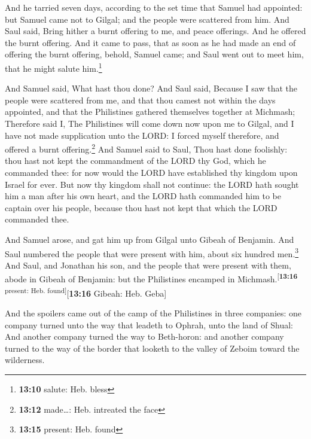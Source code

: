 And he tarried seven days, according to the set time that
Samuel had appointed: but Samuel came not to Gilgal; and the people were
scattered from him.  And Saul said, Bring hither a burnt
offering to me, and peace offerings. And he offered the burnt offering.
 And it came to pass, that as soon as he had made an end
of offering the burnt offering, behold, Samuel came; and Saul went out
to meet him, that he might salute him.\footnote{\textbf{13:10} salute:
  Heb. bless}

 And Samuel said, What hast thou done? And Saul said,
Because I saw that the people were scattered from me, and that thou
camest not within the days appointed, and that the Philistines gathered
themselves together at Michmash;  Therefore said I, The
Philistines will come down now upon me to Gilgal, and I have not made
supplication unto the LORD: I forced myself therefore, and offered a
burnt offering.\footnote{\textbf{13:12} made\ldots: Heb. intreated the
  face}  And Samuel said to Saul, Thou hast done
foolishly: thou hast not kept the commandment of the LORD thy God, which
he commanded thee: for now would the LORD have established thy kingdom
upon Israel for ever.  But now thy kingdom shall not
continue: the LORD hath sought him a man after his own heart, and the
LORD hath commanded him to be captain over his people, because thou hast
not kept that which the LORD commanded thee.

 And Samuel arose, and gat him up from Gilgal unto Gibeah
of Benjamin. And Saul numbered the people that were present with him,
about six hundred men.\footnote{\textbf{13:15} present: Heb. found}
 And Saul, and Jonathan his son, and the people that were
present with them, abode in Gibeah of Benjamin: but the Philistines
encamped in Michmash.\textsuperscript{{[}\textbf{13:16} present: Heb.
found{]}}{[}\textbf{13:16} Gibeah: Heb. Geba{]}

 And the spoilers came out of the camp of the Philistines
in three companies: one company turned unto the way that leadeth to
Ophrah, unto the land of Shual:  And another company
turned the way to Beth-horon: and another company turned to the way of
the border that looketh to the valley of Zeboim toward the wilderness.

